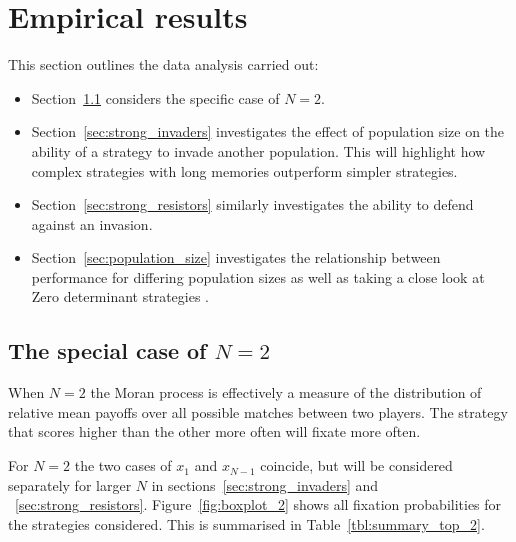 \documentclass{article}
\begin{document}
\section{Empirical results}\label{sec:empirical_results}

This section outlines the data analysis carried out:

\begin{itemize}
    \item Section~\ref{sec:two_individuals} considers the specific case of
        \(N=2\).
    \item Section~\ref{sec:strong_invaders} investigates the effect of
        population size on the ability of a strategy to invade another
        population. This will highlight how complex strategies with long
        memories outperform simpler strategies.
    \item Section~\ref{sec:strong_resistors} similarly investigates the
        ability to defend against an invasion.
    \item Section~\ref{sec:population_size} investigates the relationship
        between performance for differing population sizes as well as
        taking a close look at Zero determinant strategies \cite{Press2012}.
\end{itemize}

\subsection{The special case of \(N=2\)}\label{sec:two_individuals}

When $N=2$ the Moran process is effectively a measure of the distribution of relative
mean payoffs over all possible matches between two players. The strategy
that scores higher than the other more often will fixate more often.

For \(N=2\) the two cases of \(x_1\) and \(x_{N-1}\) coincide, but will be
considered separately for larger \(N\) in sections~\ref{sec:strong_invaders} and
~\ref{sec:strong_resistors}.  Figure~\ref{fig:boxplot_2} shows all fixation
probabilities for the strategies considered. This is summarised in
Table~\ref{tbl:summary_top_2}.
\end{document}
